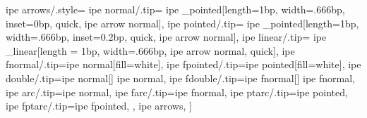   ipe arrows/.style={
    ipe normal/.tip={
      ipe _pointed[length=1bp, width=.666bp, inset=0bp,
                   quick, ipe arrow normal]},
    ipe pointed/.tip={
      ipe _pointed[length=1bp, width=.666bp, inset=0.2bp,
                   quick, ipe arrow normal]},
    ipe linear/.tip={
      ipe _linear[length = 1bp, width=.666bp,
                  ipe arrow normal, quick]},
    ipe fnormal/.tip={ipe normal[fill=white]},
    ipe fpointed/.tip={ipe pointed[fill=white]},
    ipe double/.tip={ipe normal[] ipe normal},
    ipe fdouble/.tip={ipe fnormal[] ipe fnormal},
    ipe arc/.tip={ipe normal},
    ipe farc/.tip={ipe fnormal},
    ipe ptarc/.tip={ipe pointed},
    ipe fptarc/.tip={ipe fpointed},
  },
  ipe arrows, %
]


\makeatother

\endinput
